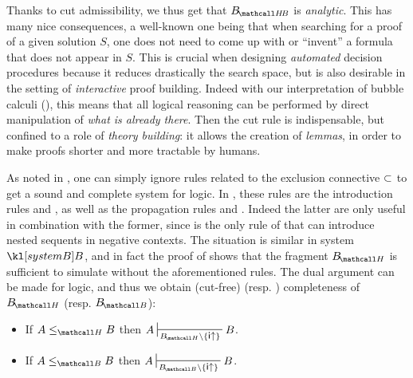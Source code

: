 Thanks to cut admissibility, we thus get that $\sysBHB$ is \emph{analytic}. This
has many nice consequences, a well-known one being that when searching for a
proof of a given solution $S$, one does not need to come up with or ``invent'' a
formula that does not appear in $S$. This is crucial when designing
\emph{automated} decision procedures because it reduces drastically the search
space, but is also desirable in the setting of \emph{interactive} proof
building. Indeed with our  interpretation of bubble calculi
(), this means that all logical reasoning can be performed
by direct manipulation of \emph{what is already there}. Then the cut rule is
indispensable, but confined to a role of \emph{theory building}: it allows the
creation of \emph{lemmas}, in order to make proofs shorter and more tractable by
humans.

As noted in \cite{postniece_deep_2009}, one can simply ignore rules related to
the exclusion connective $\subset$ to get a sound and complete system for
 logic. In , these rules are the introduction rules
 and , as well as the propagation rules
 and . Indeed the latter are only useful in
combination with the former, since  is the only rule of
 that can introduce nested sequents in negative contexts. The
situation is similar in system $\sysB$, and in fact the proof of
 shows that the  fragment $\sysBH$ is
sufficient to simulate  without the aforementioned rules. The dual
argument can be made for  logic, and thus we obtain
(cut-free)  (resp. ) completeness of $\sysBH$
(resp. $\sysBB$):

\begin{corollary}
  \sbr
  \begin{itemize}
    \item If $A \sementH B$ then $A \prov{\sysBH \setminus
    \{\rsf{i{\ua}}\}} B$.
    \item If $A \sementB B$ then $A \prov{\sysBB \setminus
    \{\rsf{i{\ua}}\}} B$.
  \end{itemize}
\end{corollary}



